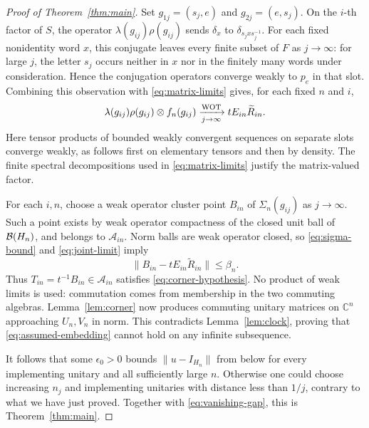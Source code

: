\begin{proof}[Proof of Theorem~\ref{thm:main}]
Set $g_{1j}=(s_j,e)$ and $g_{2j}=(e,s_j)$. On the $i$-th factor
of $S$, the operator $\lambda(g_{ij})\rho(g_{ij})$ sends
$\delta_x$ to $\delta_{s_jxs_j^{-1}}$. For each fixed nonidentity
word $x$, this conjugate leaves every finite subset of $F$ as
$j\to\infty$: for large $j$, the letter $s_j$ occurs neither in
$x$ nor in the finitely many words under consideration. Hence the
conjugation operators converge weakly to $p_e$ in that slot.
Combining this observation with \eqref{eq:matrix-limits} gives,
for each fixed $n$ and $i$,
\begin{equation}\label{eq:joint-limit}
 \lambda(g_{ij})\rho(g_{ij})\otimes f_n(g_{ij})
 \xrightarrow[j\to\infty]{\mathrm{WOT}}tE_{in}\widetilde R_{in}.
\end{equation}
Here tensor products of bounded weakly convergent sequences on
separate slots converge weakly, as follows first on elementary
tensors and then by density. The finite spectral decompositions
used in \eqref{eq:matrix-limits} justify the matrix-valued factor.

For each $i,n$, choose a weak operator cluster point $B_{in}$ of
$\Sigma_n(g_{ij})$ as $j\to\infty$. Such a point exists by weak
operator compactness of the closed unit ball of $\mathcal B(H_n)$, and
belongs to $\mathcal A_{in}$. Norm balls are weak operator closed,
so \eqref{eq:sigma-bound} and \eqref{eq:joint-limit} imply
\[
 \|B_{in}-tE_{in}\widetilde R_{in}\|\leq\beta_n.
\]
Thus $T_{in}=t^{-1}B_{in}\in\mathcal A_{in}$ satisfies
\eqref{eq:corner-hypothesis}. No product of weak limits is used:
commutation comes from membership in the two commuting algebras.
Lemma~\ref{lem:corner} now produces commuting unitary matrices on
$\mathbb C^n$ approaching $U_n,V_n$ in norm. This contradicts
Lemma~\ref{lem:clock}, proving that \eqref{eq:assumed-embedding}
cannot hold on any infinite subsequence.

It follows that some $\epsilon_0>0$ bounds
$\|u-I_{H_n}\|$ from below for every implementing unitary and all
sufficiently large $n$. Otherwise one could choose increasing
$n_j$ and implementing unitaries with distance less than $1/j$,
contrary to what we have just proved. Together with
\eqref{eq:vanishing-gap}, this is Theorem~\ref{thm:main}.
\end{proof}
